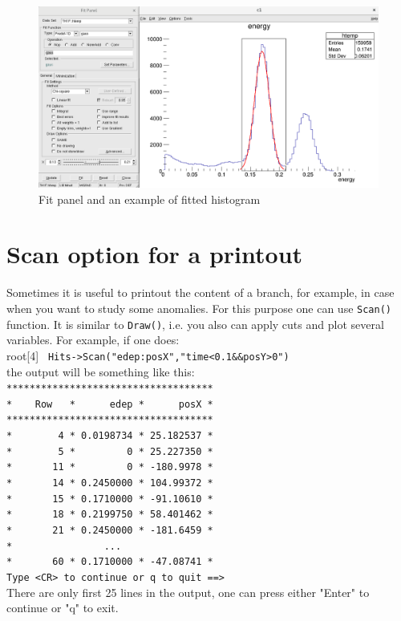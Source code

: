 \documentclass[12pt]{article}
\begin{document}
\begin{figure}[h]
\centering
\includegraphics[scale=0.35]{figs/FitPanel.png}
\caption{Fit panel and an example of fitted histogram}
\label{fig:FitPanel}
\end{figure}


\section{Scan option for a printout}
Sometimes it is useful to printout the content of a branch, for example, in case when you want to study some anomalies. For this purpose one can use \verb|Scan()| function. It is similar to \verb|Draw()|, i.e. you also can apply cuts and plot several variables. For example, if one does: \\
root[4] \verb| Hits->Scan("edep:posX","time<0.1&&posY>0") |\\
the output will be something like this:\\
\verb|************************************|\\
\verb|*    Row   *      edep *      posX *|\\
\verb|************************************|\\
\verb|*        4 * 0.0198734 * 25.182537 *|\\
\verb|*        5 *         0 * 25.227350 *|\\
\verb|*       11 *         0 * -180.9978 *|\\
\verb|*       14 * 0.2450000 * 104.99372 *|\\
\verb|*       15 * 0.1710000 * -91.10610 *|\\
\verb|*       18 * 0.2199750 * 58.401462 *|\\
\verb|*       21 * 0.2450000 * -181.6459 *|\\
\verb|*                ...                |\\
\verb|*       60 * 0.1710000 * -47.08741 *|\\
\verb|Type <CR> to continue or q to quit ==>|\\
There are only first 25 lines in the output, one can press either "Enter" to continue or "q" to exit.
\end{document}
